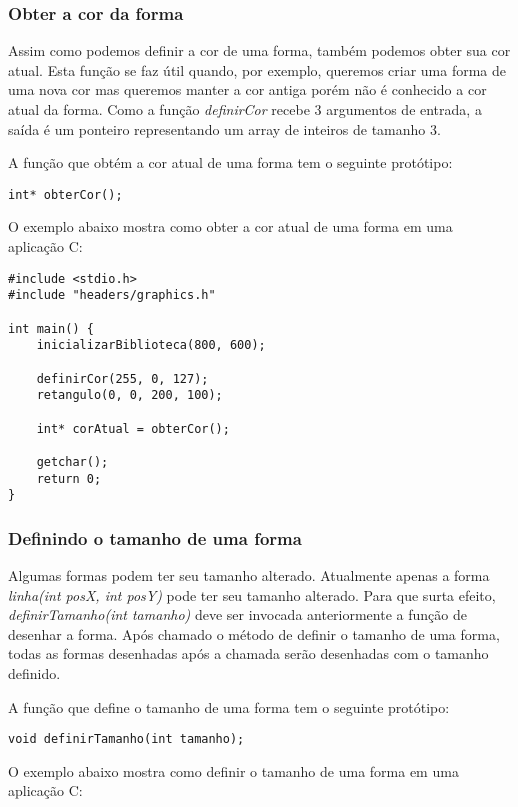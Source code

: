 \documentclass[12pt, %
openright,
oneside, %
a4paper,    %
brazil]{facom-ufu-abntex2}
\begin{document}
\subsubsection{Obter a cor da forma}
Assim como podemos definir a cor de uma forma, também podemos obter sua cor atual. Esta função se faz útil quando, por exemplo, queremos criar uma forma de uma nova cor mas queremos manter a cor antiga porém não é conhecido a cor atual da forma. Como a função \textit{definirCor} recebe 3 argumentos de entrada, a saída é um ponteiro representando um array de inteiros de tamanho 3.

A função que obtém a cor atual de uma forma tem o seguinte protótipo:

\begin{lstlisting}
int* obterCor();
\end{lstlisting}

O exemplo abaixo mostra como obter a cor atual de uma forma em uma aplicação C:

\begin{lstlisting}
#include <stdio.h>
#include "headers/graphics.h"

int main() {
    inicializarBiblioteca(800, 600);

    definirCor(255, 0, 127);
    retangulo(0, 0, 200, 100);

    int* corAtual = obterCor();

    getchar();
    return 0;
}
\end{lstlisting}

\subsubsection{Definindo o tamanho de uma forma}
Algumas formas podem ter seu tamanho alterado. Atualmente apenas a forma \textit{linha(int posX, int posY)} pode ter seu tamanho alterado. Para que surta efeito, \textit{definirTamanho(int tamanho)} deve ser invocada anteriormente a função de desenhar a forma. Após chamado o método de definir o tamanho de uma forma, todas as formas desenhadas após a chamada serão desenhadas com o tamanho definido.

A função que define o tamanho de uma forma tem o seguinte protótipo:

\begin{lstlisting}
void definirTamanho(int tamanho);
\end{lstlisting}

O exemplo abaixo mostra como definir o tamanho de uma forma em uma aplicação C:
\end{document}
